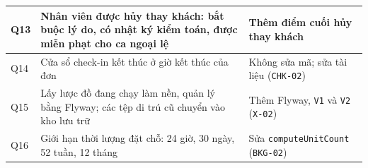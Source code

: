\begin{table}[H]
\begin{tabular}{|p{1.1cm}|p{7.6cm}|p{5.1cm}|}
\hline
Q13 & Nhân viên được hủy thay khách: bắt buộc lý do, có nhật ký kiểm toán, được miễn phạt cho ca ngoại lệ & Thêm điểm cuối hủy thay khách \\
\hline
Q14 & Cửa sổ check-in kết thúc ở giờ kết thúc của đơn & Không sửa mã; sửa tài liệu (\texttt{CHK-02}) \\
\hline
Q15 & Lấy lược đồ đang chạy làm nền, quản lý bằng Flyway; các tệp di trú cũ chuyển vào kho lưu trữ & Thêm Flyway, \texttt{V1} và \texttt{V2} (\texttt{X-02}) \\
\hline
Q16 & Giới hạn thời lượng đặt chỗ: 24 giờ, 30 ngày, 52 tuần, 12 tháng & Sửa \texttt{computeUnitCount} (\texttt{BKG-02}) \\
\hline
\end{tabular}
\end{table}
